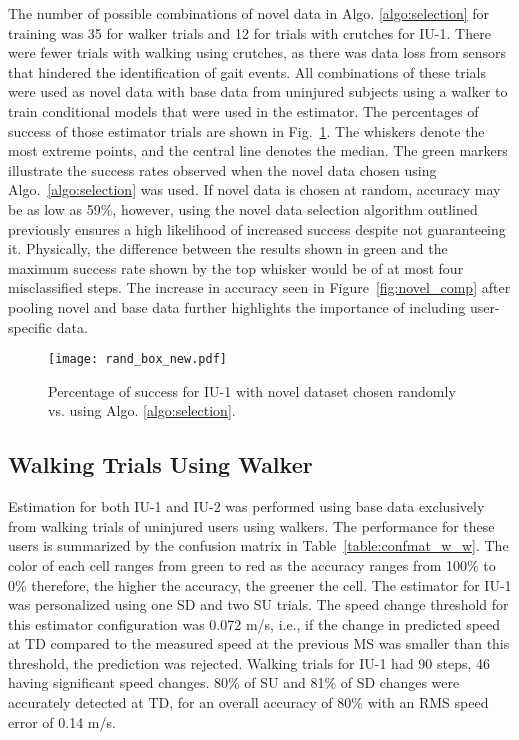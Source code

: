 The number of possible combinations of novel data in Algo. \ref{algo:selection} for training was 35 for walker trials and 12 for trials with crutches for IU-1. There were fewer trials with walking using crutches, as there was data loss from sensors that hindered the identification of gait events. All combinations of these trials were used as novel data with base data from uninjured subjects using a walker to train conditional models that were used in the estimator. The percentages of success of those estimator trials are shown in Fig.~\ref{fig:rand_box}. The whiskers denote the most extreme points, and the central line denotes the median. The green markers illustrate the success rates observed when the novel data chosen using Algo.~\ref{algo:selection} was used. If novel data is chosen at random, accuracy may be as low as 59\%, however, using the novel data selection algorithm outlined previously ensures a high likelihood of increased success despite not guaranteeing it. Physically, the difference between the results shown in green and the maximum success rate shown by the top whisker would be of at most four misclassified steps. The increase in accuracy seen in Figure~\ref{fig:novel_comp} after pooling novel and base data further highlights the importance of including user-specific data.

\begin{figure}
	\centering
	\texttt{[image: rand\_box\_new.pdf]}
	\caption{Percentage of success for IU-1 with novel dataset chosen randomly vs. using Algo. \ref{algo:selection}.}\label{fig:rand_box}
\end{figure}

\subsection{Walking Trials Using Walker}\label{subsec:ww}
Estimation for both IU-1 and IU-2 was performed using base data exclusively from walking trials of uninjured users using walkers. The performance for these users is summarized by the confusion matrix in Table~\ref{table:confmat_w_w}. The color of each cell ranges from green to red as the accuracy ranges from 100\% to 0\% therefore, the higher the accuracy, the greener the cell.  The estimator for IU-1 was personalized using one SD and two SU trials. The speed change threshold for this estimator configuration was 0.072 m/s, i.e., if the change in predicted speed at TD compared to the measured speed at the previous MS was smaller than this threshold, the prediction was rejected. Walking trials for IU-1 had 90 steps, 46 having significant speed changes. 80\% of SU and 81\% of SD changes were accurately detected at TD, for an overall accuracy of 80\% with an RMS speed error of 0.14 m/s.


